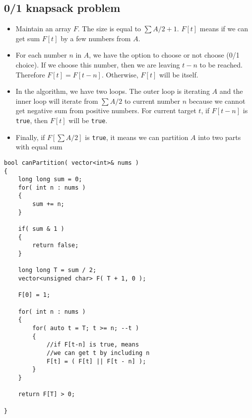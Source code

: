 \subsection{0/1 knapsack problem}
\begin{itemize}
\item Maintain an array $F$. The size is equal to $\sum\limits A /2 + 1$. $F[t]$ means if we can get sum $F[t]$ by a few numbers from $A$. 
\item For each number $n$ in $A$, we have the option to choose or not choose (0/1 choice). If we choose this number, then we are leaving $t-n$ to be reached. Therefore $F[t] = F[t-n]$. Otherwise, $F[t]$ will be itself.
\item In the algorithm, we have two loops. The outer loop is iterating $A$ and the inner loop will iterate from $\sum\limits A /2$ to current number $n$ because we cannot get negative sum from positive numbers. For current target $t$, if $F[t-n]$ is \texttt{true}, then $F[t]$ will be \texttt{true}.
\item Finally, if $F[\sum\limits A /2]$ is \texttt{true}, it means we can partition $A$ into two parts with equal sum
\end{itemize}

\begin{lstlisting}[style=customc, caption={Bottom-up Dynamic Programming}]
bool canPartition( vector<int>& nums )
{
    long long sum = 0;
    for( int n : nums )
    {
        sum += n;
    }

    if( sum & 1 )
    {
        return false;
    }

    long long T = sum / 2;
    vector<unsigned char> F( T + 1, 0 );

    F[0] = 1;

    for( int n : nums )
    {
        for( auto t = T; t >= n; --t )
        {
            //if F[t-n] is true, means
            //we can get t by including n
            F[t] = ( F[t] || F[t - n] );
        }
    }

    return F[T] > 0;

}
\end{lstlisting}

